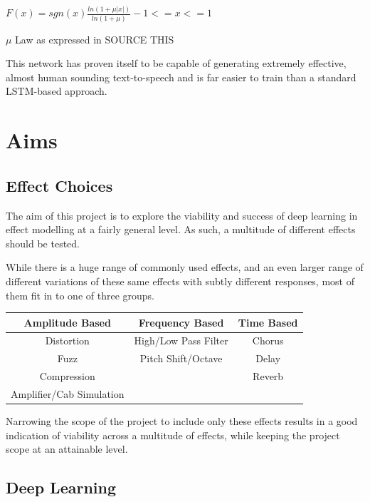 \documentclass{l4proj}
\begin{document}
\begin{center}

    $F(x) = sgn(x)\frac{ln(1+\mu|x|)}{ln(1+\mu)} -1 <= x <= 1$

    $\mu$ Law as expressed in \LARGE{SOURCE THIS}
\end{center}

This network has proven itself to be capable of generating extremely
effective, almost human sounding text-to-speech and is far easier to
train than a standard LSTM-based approach.

\chapter{Aims}\label{aims}

\section{Effect Choices}\label{effect-choices}

The aim of this project is to explore the viability and success of deep
learning in effect modelling at a fairly general level. As such, a
multitude of different effects should be tested.

While there is a huge range of commonly used effects, and an even larger
range of different variations of these same effects with subtly
different responses, most of them fit in to one of three groups.

\begin{center}
\begin{tabular}{ |c|c|c| } 
 \hline
    \textbf{Amplitude Based} & \textbf{Frequency Based} & \textbf{Time Based} \\ 
 \hline
 Distortion & High/Low Pass Filter & Chorus \\ 
 Fuzz & Pitch Shift/Octave & Delay \\ 
 Compression & & Reverb \\ 
 Amplifier/Cab Simulation & & \\ 
 \hline
\end{tabular}
\end{center}

Narrowing the scope of the project to include only these effects results
in a good indication of viability across a multitude of effects, while
keeping the project scope at an attainable level.

\section{Deep Learning}\label{deep-learning}
\end{document}
